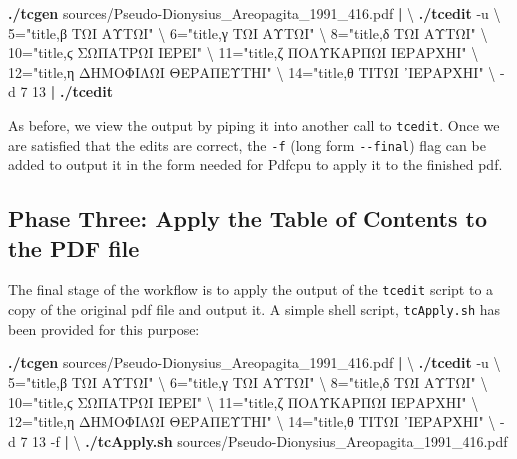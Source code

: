 \documentclass[
  letterpaper,
]{tufte-handout}
\newenvironment{Shaded}{\begin{snugshade}}{\end{snugshade}}
\newcommand{\AttributeTok}[1]{\textcolor[rgb]{0.00,0.34,0.68}{#1}}
\newcommand{\DataTypeTok}[1]{\textcolor[rgb]{0.00,0.34,0.68}{#1}}
\newcommand{\ExtensionTok}[1]{\textcolor[rgb]{0.00,0.58,1.00}{\textbf{#1}}}
\newcommand{\KeywordTok}[1]{\textcolor[rgb]{0.12,0.11,0.11}{\textbf{#1}}}
\newcommand{\NormalTok}[1]{\textcolor[rgb]{0.12,0.11,0.11}{#1}}
\newcommand{\StringTok}[1]{\textcolor[rgb]{0.75,0.01,0.01}{#1}}
\begin{document}
\begin{Shaded}
\begin{Highlighting}[]
\ExtensionTok{./tcgen}\NormalTok{ sources/Pseudo{-}Dionysius\_Areopagita\_1991\_416.pdf }\KeywordTok{|} \DataTypeTok{\textbackslash{}}
\ExtensionTok{./tcedit} \AttributeTok{{-}u} \DataTypeTok{\textbackslash{}}
\NormalTok{5=}\StringTok{"title,β ΤΩΙ ΑΥΤΩΙ"} \DataTypeTok{\textbackslash{}}
\NormalTok{6=}\StringTok{"title,γ ΤΩΙ ΑΥΤΩΙ"} \DataTypeTok{\textbackslash{}}
\NormalTok{8=}\StringTok{"title,δ ΤΩΙ ΑΥΤΩΙ"} \DataTypeTok{\textbackslash{}}
\NormalTok{10=}\StringTok{"title,ϛ ΣΩΠΑΤΡΩΙ ΙEPEΙ"} \DataTypeTok{\textbackslash{}}
\NormalTok{11=}\StringTok{"title,ζ ΠΟΛΥΚΑΡΠΩΙ ΙΕΡΑΡΧΗΙ"} \DataTypeTok{\textbackslash{}}
\NormalTok{12=}\StringTok{"title,η ΔΗΜΟΦΙΛΩΙ ΘΕΡΑΠΕΥΤΗΙ"} \DataTypeTok{\textbackslash{}}
\NormalTok{14=}\StringTok{"title,θ ΤΙΤΩΙ ᾽ΙΕΡΑΡΧΗΙ"} \DataTypeTok{\textbackslash{}}
\NormalTok{{-}d 7 13 }\KeywordTok{|} \ExtensionTok{./tcedit}
\end{Highlighting}
\end{Shaded}

As before, we view the output by piping it into another call to
\texttt{tcedit}. Once we are satisfied that the edits are correct, the
\texttt{-f} (long form \texttt{-\/-final}) flag can be added to output
it in the form needed for Pdfcpu to apply it to the finished pdf.

\subsection{Phase Three: Apply the Table of Contents to the PDF
file}\label{phase-three-apply-the-table-of-contents-to-the-pdf-file}

The final stage of the workflow is to apply the output of the
\texttt{tcedit} script to a copy of the original pdf file and output it.
A simple shell script, \texttt{tcApply.sh} has been provided for this
purpose:

\begin{Shaded}
\begin{Highlighting}[]
\ExtensionTok{./tcgen}\NormalTok{ sources/Pseudo{-}Dionysius\_Areopagita\_1991\_416.pdf }\KeywordTok{|} \DataTypeTok{\textbackslash{}}
\ExtensionTok{./tcedit} \AttributeTok{{-}u} \DataTypeTok{\textbackslash{}}
\NormalTok{5=}\StringTok{"title,β ΤΩΙ ΑΥΤΩΙ"} \DataTypeTok{\textbackslash{}}
\NormalTok{6=}\StringTok{"title,γ ΤΩΙ ΑΥΤΩΙ"} \DataTypeTok{\textbackslash{}}
\NormalTok{8=}\StringTok{"title,δ ΤΩΙ ΑΥΤΩΙ"} \DataTypeTok{\textbackslash{}}
\NormalTok{10=}\StringTok{"title,ϛ ΣΩΠΑΤΡΩΙ ΙEPEΙ"} \DataTypeTok{\textbackslash{}}
\NormalTok{11=}\StringTok{"title,ζ ΠΟΛΥΚΑΡΠΩΙ ΙΕΡΑΡΧΗΙ"} \DataTypeTok{\textbackslash{}}
\NormalTok{12=}\StringTok{"title,η ΔΗΜΟΦΙΛΩΙ ΘΕΡΑΠΕΥΤΗΙ"} \DataTypeTok{\textbackslash{}}
\NormalTok{14=}\StringTok{"title,θ ΤΙΤΩΙ ᾽ΙΕΡΑΡΧΗΙ"} \DataTypeTok{\textbackslash{}}
\NormalTok{{-}d 7 13 }\AttributeTok{{-}f} \KeywordTok{|} \DataTypeTok{\textbackslash{}}
\ExtensionTok{./tcApply.sh}\NormalTok{ sources/Pseudo{-}Dionysius\_Areopagita\_1991\_416.pdf}
\end{Highlighting}
\end{Shaded}
\end{document}
